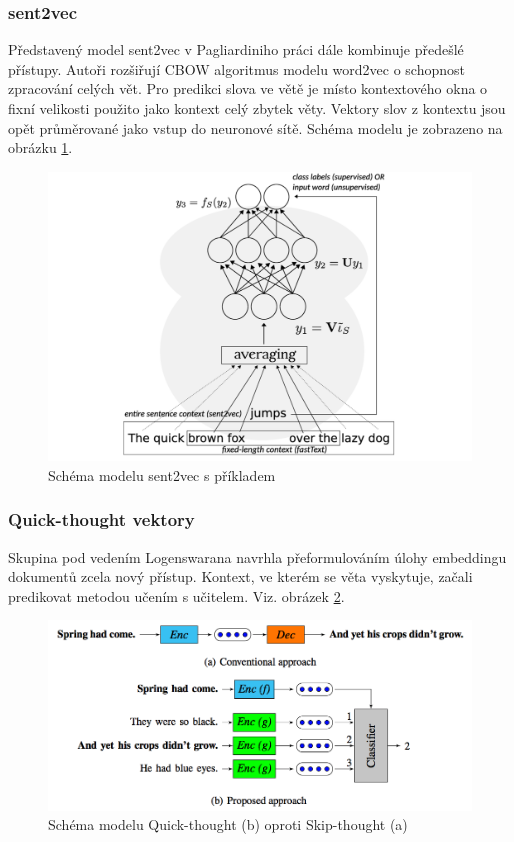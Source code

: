 \documentclass[thesis=M,czech]{FITthesis}[2019/12/23]
\begin{document}
\subsubsection{sent2vec}
Představený model sent2vec v Pagliardiniho\cite{pagliardini2018} práci dále kombinuje předešlé přístupy. Autoři rozšiřují CBOW algoritmus modelu word2vec o schopnost zpracování celých vět. Pro predikci slova ve větě je místo kontextového okna o fixní velikosti použito jako kontext celý zbytek věty. Vektory slov z kontextu jsou opět průměrované jako vstup do neuronové sítě. Schéma modelu je zobrazeno na obrázku \ref{fig:palachy2019sent2vec}.
\begin{figure}\centering
	\includegraphics[width=\textwidth]{images/palachy2019/palachy2019_sent2vec.png}
	\caption{Schéma modelu sent2vec s příkladem\cite{palachy2019}}\label{fig:palachy2019sent2vec}
\end{figure}

\subsubsection{Quick-thought vektory}
Skupina pod vedením Logenswarana\cite{logenswaran2018} navrhla přeformulováním úlohy embeddingu dokumentů zcela nový přístup. Kontext, ve kterém se věta vyskytuje, začali predikovat metodou učením s učitelem. Viz. obrázek \ref{fig:palachy2019QT}.
\begin{figure}\centering
	\includegraphics[width=\textwidth]{images/palachy2019/palachy2019_QT.png}
	\caption{Schéma modelu Quick-thought (b) oproti Skip-thought (a) \cite{palachy2019}}\label{fig:palachy2019QT}
\end{figure}
\end{document}
